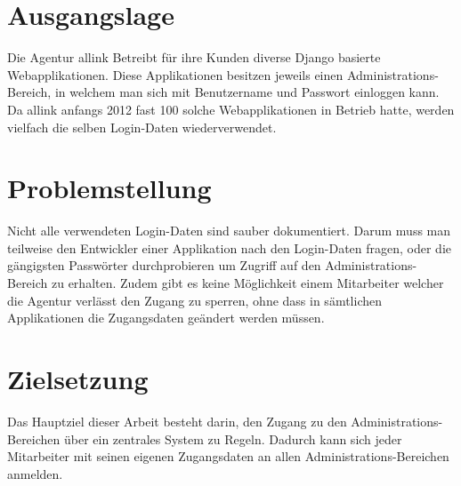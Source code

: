 \section{Ausgangslage}
\label{sec:EinleitungAusgangslage}
Die Agentur allink Betreibt für ihre Kunden diverse Django basierte Webapplikationen. Diese Applikationen besitzen jeweils einen Administrations-Bereich, in welchem man sich mit Benutzername und Passwort einloggen kann. Da allink anfangs 2012 fast 100 solche Webapplikationen in Betrieb hatte, werden vielfach die selben Login-Daten wiederverwendet.

\section{Problemstellung}
\label{sec:Problemstellung}
Nicht alle verwendeten Login-Daten sind sauber dokumentiert. Darum muss man teilweise den Entwickler einer Applikation nach den Login-Daten fragen, oder die gängigsten Passwörter durchprobieren um Zugriff auf den Administrations-Bereich zu erhalten. Zudem gibt es keine Möglichkeit einem Mitarbeiter welcher die Agentur verlässt den Zugang zu sperren, ohne dass in sämtlichen Applikationen die Zugangsdaten geändert werden müssen.

\section{Zielsetzung}
\label{sec:Zielsetzung}
Das Hauptziel dieser Arbeit besteht darin, den Zugang zu den Administrations-Bereichen über ein zentrales System zu Regeln. Dadurch kann sich jeder Mitarbeiter mit seinen eigenen Zugangsdaten an allen Administrations-Bereichen anmelden.
